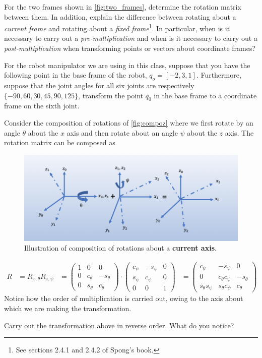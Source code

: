 \noindent 
\begin{homework}
	For the two frames shown in \autoref{fig:two_frames}, determine the rotation matrix between them. In addition, explain the difference between rotating about a \textit{current frame} and rotating about a \textit{fixed frame}\footnote{See sections 2.4.1 and 2.4.2 of Spong's book.}. In particular, when is it necessary to carry out a \textit{pre-multiplication} and when is it necessary to carry out a \textit{post-multiplication} when transforming points or vectors about coordinate frames?
\end{homework}


\noindent 
\begin{homework}
	For the robot manipulator we are using in this class, suppose that you have the following point in the base frame of the robot, $q_o = [-2, 3, 1]$. Furthermore, suppose that the joint angles for all six joints are respectively $\{-90, 60, 30, 45, 90, 125 \}$, transform the point $q_0$ in the base frame to a coordinate frame on the sixth joint.
\end{homework}


Consider the composition of rotations of \autoref{fig:compoz} where we first rotate by an angle $\theta$ about the $x$ axis and then rotate about an angle $\psi$ about the $z$ axis. The rotation matrix can be composed as 
%
\begin{figure}[tb!]
	\centering
	\includegraphics[width=\columnwidth]{../lec_notes/figures/compoz.png}
	\caption{Illustration of composition of rotations about a \textbf{current axis}.}
	\label{fig:compoz}
\end{figure}
%
\begin{align}
R &= R_{x, \theta} R_{z, \psi} 
%
&= \left(\begin{array}{ccc}
1 & 0 & 0 \\
0 & c_\theta & -s_\theta \\
0 & s_\theta & c_\theta
\end{array}\right) 
%
\cdot
%
\left(\begin{array}{ccc}
c_\psi & -s_\psi & 0 \\
s_\psi & c_\psi & 0 \\
0 & 0 & 1
\end{array}\right)
%
&= \left(\begin{array}{ccc}
c_\psi & -s_\psi & 0 \\
0 & c_\theta c_\psi &  -s_\theta \\
s_\theta s_\psi & s_\theta c_\psi & c_\theta 
\end{array}\right)
\end{align}
%
Notice how the order of multiplication is carried out, owing to the axis about which we are making the transformation. 

\noindent 
\begin{homework}
	Carry out the transformation above in reverse order. What do you notice?
\end{homework} 